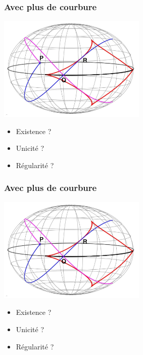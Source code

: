 \documentclass[9pt]{beamer}
\begin{document}
\begin{frame}
\frametitle{\bf Avec plus de courbure}
 
\centering \includegraphics[height=5.0cm]{ellip}

\begin{itemize}
  \item Existence ?
  \item Unicit\'e ?
  \item R\'egularit\'e ?
\end{itemize}

\end{frame}

\begin{frame}
\frametitle{\bf Avec plus de courbure}
 
\centering \includegraphics[height=5.0cm]{ellip}

\begin{itemize}
  \item Existence ?
  \item Unicit\'e ?
  \item R\'egularit\'e ?
\end{itemize}

\end{frame}

\end{document}
